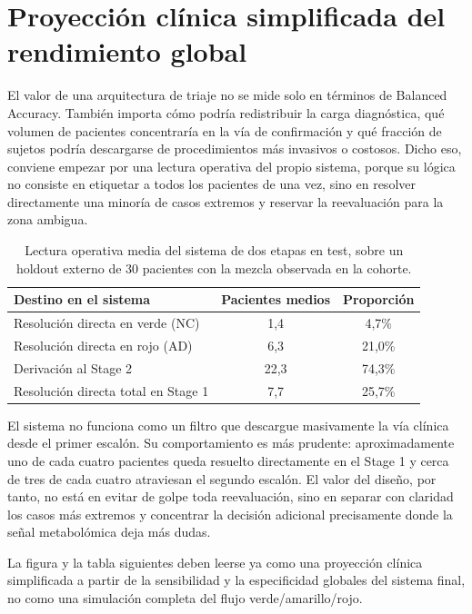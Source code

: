 \section{Proyección clínica simplificada del rendimiento global}\label{sec:impacto}

El valor de una arquitectura de triaje no se mide solo en términos de Balanced Accuracy. También importa cómo podría
redistribuir la carga diagnóstica, qué volumen de pacientes concentraría en la vía de confirmación y qué fracción de
sujetos podría descargarse de procedimientos más invasivos o costosos. Dicho eso, conviene empezar por una lectura
operativa del propio sistema, porque su lógica no consiste en etiquetar a todos los pacientes de una vez, sino en
resolver directamente una minoría de casos extremos y reservar la reevaluación para la zona ambigua.

\begin{table}[ht]
\centering
\caption{Lectura operativa media del sistema de dos etapas en test, sobre un holdout externo de 30 pacientes con la mezcla observada en la cohorte.}
\label{tab:cascade_flow_summary}
\begin{tabular}{lcc}
\hline
\textbf{Destino en el sistema} & \textbf{Pacientes medios} & \textbf{Proporción} \\
\hline
Resolución directa en verde (NC) & 1,4 & 4,7\% \\
Resolución directa en rojo (AD) & 6,3 & 21,0\% \\
Derivación al Stage 2 & 22,3 & 74,3\% \\
Resolución directa total en Stage 1 & 7,7 & 25,7\% \\
\hline
\end{tabular}
\end{table}

El sistema no funciona como un filtro que descargue masivamente la vía clínica desde el primer escalón. Su
comportamiento es más prudente: aproximadamente uno de cada cuatro pacientes queda resuelto directamente en el Stage 1 y
cerca de tres de cada cuatro atraviesan el segundo escalón. El valor del diseño, por tanto, no está en evitar de golpe
toda reevaluación, sino en separar con claridad los casos más extremos y concentrar la decisión adicional precisamente
donde la señal metabolómica deja más dudas.

La figura y la tabla siguientes deben leerse ya como una proyección clínica simplificada a partir de la sensibilidad y
la especificidad globales del sistema final, no como una simulación completa del flujo verde/amarillo/rojo.

